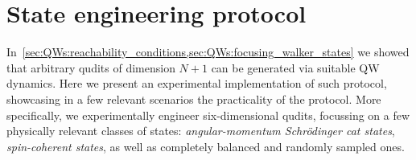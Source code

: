 


\section{State engineering protocol}
\label{sec:expQWs:experimental_apparatus}

In~\cref{sec:QWs:reachability_conditions,sec:QWs:focusing_walker_states} we showed that arbitrary qudits of dimension $N+1$ can be generated via suitable \ac{QW} dynamics. Here we present an experimental implementation of such protocol, showcasing in a few relevant scenarios the practicality of the protocol.
More specifically, we experimentally engineer six-dimensional qudits, focussing on a few physically relevant classes of states: \emph{angular-momentum Schrödinger cat states}, \emph{spin-coherent states}, as well as completely balanced and randomly sampled ones.

